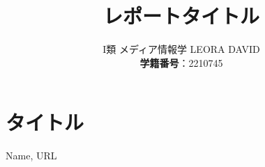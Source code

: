 \documentclass[]{jsarticle}
\title{\vspace{-3cm} レポートタイトル}
\author{I類 メディア情報学 LEORA DAVID\\\textbf{学籍番号}：2210745}
\date{}
\begin{document}
\maketitle

\section{タイトル}


\newpage
\begin{thebibliography}{99}
   Name, URL
\end{thebibliography}
\end{document}
